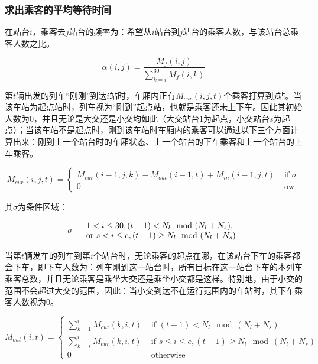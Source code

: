 \subsubsection{求出乘客的平均等待时间}

在站台$i$，乘客去$j$站台的频率为：希望从$i$站台到$j$站台的乘客人数，与该站台总乘客人数之比。

\begin{equation}
\alpha(i, j) = 
	\frac {M_f(i, j)}{\sum _{k = i} ^{30} M_f(i, k)}
\end{equation}

第$t$辆出发的列车“刚刚”到达$i$站时，车厢内正有$M_{cur}(i, j, t)$个乘客打算到$j$站。当该车站为起点站时，列车视为“刚到”起点站，也就是乘客还未上下车。因此其初始人数为$0$，并且无论是大交还是小交均如此（大交站台$1$为起点，小交站台$s$为起点）；当该车站不是起点时，刚到该车站时车厢内的乘客可以通过以下三个方面计算出来：刚到上一个站台时的车厢状态、上一个站台的下车乘客和上一个站台的上车乘客。

\begin{equation}
M_{cur}(i, j, t) = 
	\begin{cases}
	M_{cur}(i - 1, j, k) - M_{out}(i - 1, t) + M_{in}(i - 1, j, t)  & \text{ if }\sigma \\
	0  & \text{ ow }
	\end{cases}
\end{equation}

其$\sigma$为条件区域：

\begin{equation}
    \sigma = 
        \begin{matrix}
 		1 < i \leq 30, (t - 1) < N_l \mod (N_l + N_s),  \\
		\text{ or } s < i \leq e, (t - 1) \geq N_l \mod (N_l + N_s)\\
		\end{matrix} \\
\end{equation}

当第$t$辆发车的列车到第$i$个站台时，无论乘客的起点在哪，在该站台下车的乘客都会下车，即下车人数为：列车刚到这一站台时，所有目标在这一站台下车的本列车乘客总数，并且无论乘客是乘坐大交还是乘坐小交都是这样。特别地，由于小交的范围不会超过大交的范围，因此：当小交到达不在运行范围内的车站时，其下车乘客人数视为$0$。

\begin{equation}
M_{out}(i, t) = 
	\begin{cases}
	\sum _{k = 1} ^{i} M_{cur}(k, i, t)  & \text{ if } (t - 1) < N_l \mod (N_l + N_s) \\
	\sum _{k = s} ^{i} M_{cur}(k, i, t)  & \text{ if } s \leq i \leq e, (t - 1) \geq N_l \mod (N_l + N_s) \\
	0 & \text{ otherwise }
	\end{cases}
\end{equation}

